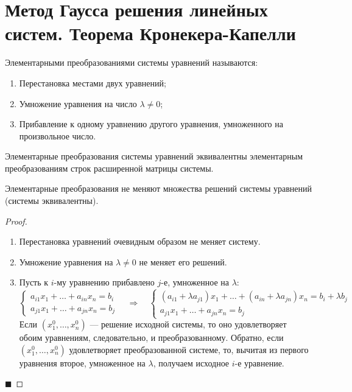 \section{Метод Гаусса решения линейных систем. Теорема Кронекера-Капелли}

\begin{definition}
Элементарными преобразованиями системы уравнений называются:
\begin{enumerate}
    \item Перестановка местами двух уравнений;
    \item Умножение уравнения на число $\lambda \neq 0$;
    \item Прибавление к одному уравнению другого уравнения, умноженного на произвольное число.
\end{enumerate}
\end{definition}

\begin{remark}
Элементарные преобразования системы уравнений эквивалентны элементарным преобразованиям строк расширенной матрицы системы.
\end{remark}

\begin{theorem}
Элементарные преобразования не меняют множества решений системы уравнений (системы эквивалентны).
\end{theorem}

\begin{proof}
\begin{enumerate}
    \item Перестановка уравнений очевидным образом не меняет систему.
    \item Умножение уравнения на $\lambda \neq 0$ не меняет его решений.
    \item Пусть к $i$-му уравнению прибавлено $j$-е, умноженное на $\lambda$:
    \[
    \begin{cases}
    a_{i1}x_1 + \ldots + a_{in}x_n = b_i \\
    a_{j1}x_1 + \ldots + a_{jn}x_n = b_j
    \end{cases}
    \quad \Rightarrow \quad
    \begin{cases}
    (a_{i1} + \lambda a_{j1})x_1 + \ldots + (a_{in} + \lambda a_{jn})x_n = b_i + \lambda b_j \\
    a_{j1}x_1 + \ldots + a_{jn}x_n = b_j
    \end{cases}
    \]
    Если $(x_1^0, \ldots, x_n^0)$ --- решение исходной системы, то оно удовлетворяет обоим уравнениям, следовательно, и преобразованному. Обратно, если $(x_1^0, \ldots, x_n^0)$ удовлетворяет преобразованной системе, то, вычитая из первого уравнения второе, умноженное на $\lambda$, получаем исходное $i$-е уравнение.
\end{enumerate}
\hfill$\blacksquare$
\end{proof}

